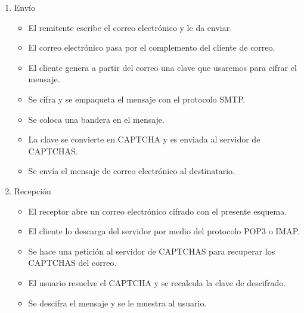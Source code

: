 \documentclass[12pt,oneside,onecolumn,openany]{report}
\begin{document}
\begin{enumerate}
 \item {Envío}
\begin{itemize}
\item El remitente escribe el correo electrónico y le da enviar.\\
\item El correo electrónico pasa por el complemento del cliente de correo.\\
\item El cliente genera a partir del correo una clave que usaremos para cifrar el mensaje.\\
\item Se cifra y se empaqueta el mensaje con el protocolo SMTP.\\
\item Se coloca una bandera en el mensaje.\\
\item La clave se convierte en CAPTCHA y es enviada al servidor de CAPTCHAS.\\
\item Se envía el mensaje de correo electrónico al destinatario.\\
\end{itemize}

\item{Recepción}
\begin{itemize}
\item El receptor abre un correo electrónico cifrado con el presente esquema.\\
\item El cliente lo descarga del servidor por medio del protocolo POP3 o IMAP.\\
\item Se hace una petición al servidor de CAPTCHAS para recuperar los CAPTCHAS del correo.\\
\item El usuario resuelve el CAPTCHA y se recalcula la clave de descifrado.\\
\item Se descifra el mensaje y se le muestra al usuario.\\
\end{itemize}
\end{enumerate}
\end{document}

